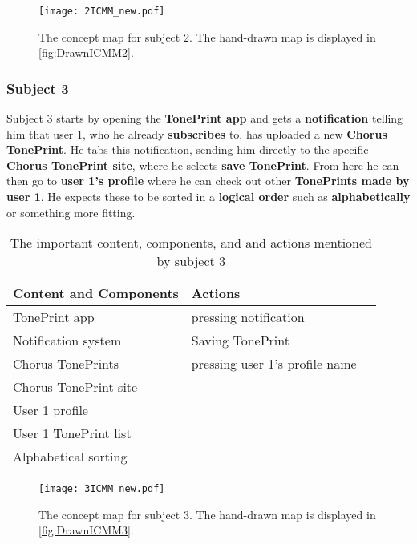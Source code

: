 %
\begin{figure}[H]
	\centering
	\texttt{[image: 2ICMM\_new.pdf]}
	\caption{The concept map for subject 2. The hand-drawn map is displayed in \autoref{fig:DrawnICMM2}.}
	\label{fig:ICMM2}
\end{figure}


\subsubsection{Subject 3}
\label{Subject3}
Subject 3 starts by opening the \textbf{TonePrint app} and gets a \textbf{notification} telling him that user 1, who he already \textbf{subscribes} to, has uploaded a new \textbf{Chorus TonePrint}. He tabs this notification, sending him directly to the specific \textbf{Chorus TonePrint site}, where he selects \textbf{save TonePrint}. From here he can then go to \textbf{user 1's profile} where he can check out other \textbf{TonePrints made by user 1}. He expects these to be sorted in a \textbf{logical order} such as \textbf{alphabetically} or something more fitting. \\
%
\begin{table}[H]
\begin{minipage}[b]{\linewidth}\centering
	\begin{tabular} {|l|l|l|} \hline
		\rowcolor{xGray25} \textbf{Content and Components} & \textbf{Actions} \\  \hline
		TonePrint app & pressing notification \\
		Notification system & Saving TonePrint \\
		Chorus TonePrints & pressing user 1's profile name \\
		Chorus TonePrint site &  \\
		User 1 profile &  \\
		User 1 TonePrint list &  \\
		Alphabetical sorting &  \\ \hline
	\end{tabular}
	\caption{The important content, components, and and actions mentioned by subject 3}
	\label{tab:Subject3ContentActions}
\end{minipage}
\end{table}
%
\begin{figure}[H]
	\centering
	\texttt{[image: 3ICMM\_new.pdf]}
	\caption{The concept map for subject 3. The hand-drawn map is displayed in \autoref{fig:DrawnICMM3}.}
	\label{fig:ICMM3}
\end{figure}


